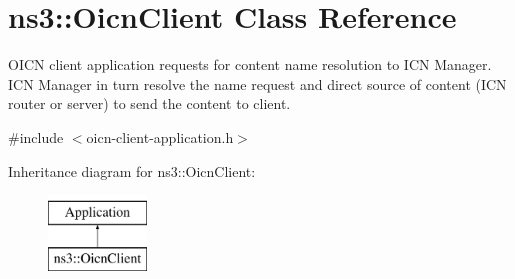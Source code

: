 \hypertarget{classns3_1_1OicnClient}{\section{ns3\-:\-:Oicn\-Client Class Reference}
\label{classns3_1_1OicnClient}
}


O\-I\-C\-N client application requests for content name resolution to I\-C\-N Manager. I\-C\-N Manager in turn resolve the name request and direct source of content (I\-C\-N router or server) to send the content to client.  




{\ttfamily \#include $<$oicn-\/client-\/application.\-h$>$}

Inheritance diagram for ns3\-:\-:Oicn\-Client\-:\begin{figure}[H]
\begin{center}
\leavevmode
\includegraphics[height=2.000000cm]{classns3_1_1OicnClient}
\end{center}
\end{figure}
